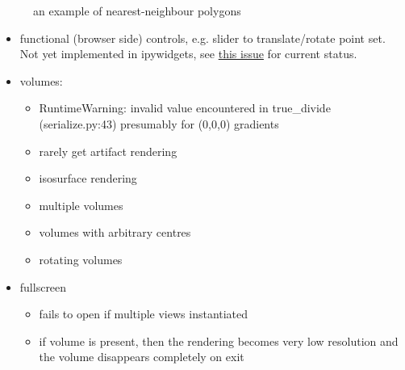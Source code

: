 \documentclass[10pt,parskip=half,
	toc=sectionentrywithdots,
	bibliography=totocnumbered,
	captions=tableheading,numbers=noendperiod]{scrartcl}
\providecommand{\tightlist}{%
  \setlength{\itemsep}{0pt}\setlength{\parskip}{0pt}}
\begin{document}
\begin{figure}[H]\begin{center}\end{center}\caption{an example of nearest-neighbour polygons}\label{fig:nnpolygons}
    \end{figure}

\begin{itemize}
\tightlist
\item
  functional (browser side) controls, e.g. slider to translate/rotate
  point set. Not yet implemented in ipywidgets, see
  \href{https://github.com/jupyter-widgets/ipywidgets/issues/1109}{this
  issue} for current status.
\item
  volumes:

  \begin{itemize}
  \tightlist
  \item
    RuntimeWarning: invalid value encountered in true\_divide
    (serialize.py:43) presumably for (0,0,0) gradients
  \item
    rarely get artifact rendering
  \item
    isosurface rendering
  \item
    multiple volumes
  \item
    volumes with arbitrary centres
  \item
    rotating volumes
  \end{itemize}
\item
  fullscreen

  \begin{itemize}
  \tightlist
  \item
    fails to open if multiple views instantiated
  \item
    if volume is present, then the rendering becomes very low resolution
    and the volume disappears completely on exit
  \end{itemize}
\end{itemize}

	
\end{document}
